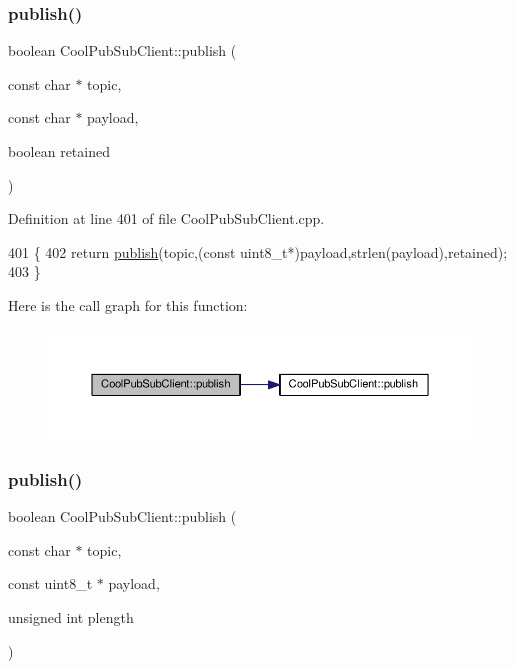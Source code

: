 \subsubsection{\texorpdfstring{publish()}{publish()}\hspace{0.1cm}{\footnotesize\ttfamily [2/4]}}
{\footnotesize\ttfamily boolean Cool\+Pub\+Sub\+Client\+::publish (\begin{DoxyParamCaption}\item[{const char $\ast$}]{topic,  }\item[{const char $\ast$}]{payload,  }\item[{boolean}]{retained }\end{DoxyParamCaption})}



Definition at line 401 of file Cool\+Pub\+Sub\+Client.\+cpp.


\begin{DoxyCode}
401                                                                                           \{
402     \textcolor{keywordflow}{return} \hyperlink{class_cool_pub_sub_client_ab6ad5fa2d3db8f91454027257f225a89}{publish}(topic,(\textcolor{keyword}{const} uint8\_t*)payload,strlen(payload),retained);
403 \}
\end{DoxyCode}
Here is the call graph for this function\+:\nopagebreak
\begin{figure}[H]
\begin{center}
\leavevmode
\includegraphics[width=350pt]{d8/d4b/class_cool_pub_sub_client_a0b01cef98af0b57d8da4df373e196448_cgraph}
\end{center}
\end{figure}
\mbox{\label{class_cool_pub_sub_client_abf184c0968a6655b68b5fdfbbc0c87d1}} 
\subsubsection{\texorpdfstring{publish()}{publish()}\hspace{0.1cm}{\footnotesize\ttfamily [3/4]}}
{\footnotesize\ttfamily boolean Cool\+Pub\+Sub\+Client\+::publish (\begin{DoxyParamCaption}\item[{const char $\ast$}]{topic,  }\item[{const uint8\+\_\+t $\ast$}]{payload,  }\item[{unsigned int}]{plength }\end{DoxyParamCaption})}



